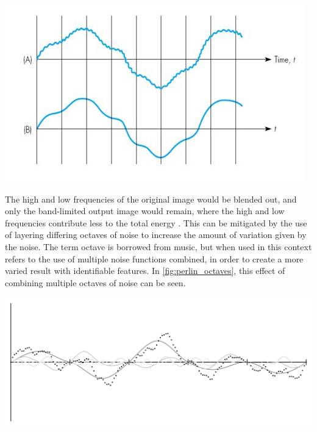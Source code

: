 \documentclass[10pt]{report}
\begin{document}
		\begin{minipage}{\textwidth}
			\centering
			\includegraphics[scale=.5]{bandlimiting-filter}
			\label{fig:bandlimit}
		\end{minipage}
		
		The high and low frequencies of the original image would be blended out, and only the band-limited output image would remain, where the high and low frequencies contribute less to the total energy \cite{making-noise}. This can be mitigated by the use of layering differing octaves of noise to increase the amount of variation given by the noise. The term octave is borrowed from music, but when used in this context refers to the use of multiple noise functions combined, in order to create a more varied result with identifiable features. In \autoref{fig:perlin_octaves}, this effect of combining multiple octaves of noise can be seen.
		
		\begin{minipage}{\textwidth}
			\centering
			\includegraphics[scale=.4]{perlin_octaves}
			\label{fig:perlin_octaves}
		\end{minipage}
	
\end{document}
